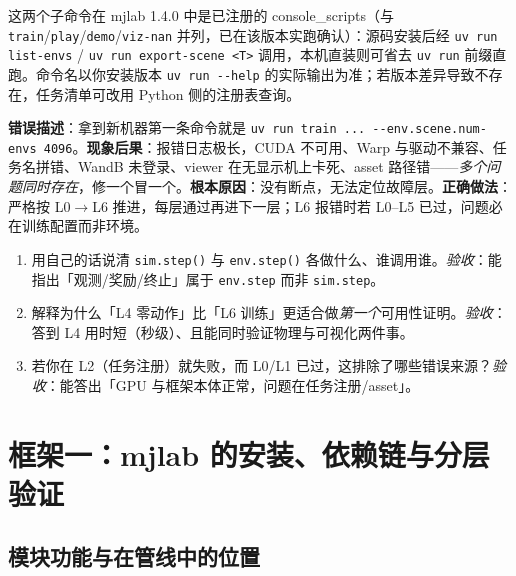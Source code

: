 \begin{note}
这两个子命令在 mjlab 1.4.0 中是已注册的 console\_scripts（与 \verb|train|/\verb|play|/\verb|demo|/\verb|viz-nan| 并列，已在该版本实跑确认）：源码安装后经 \verb|uv run list-envs| / \verb|uv run export-scene <T>| 调用，本机直装则可省去 \verb|uv run| 前缀直跑。命令名以你安装版本 \verb|uv run --help| 的实际输出为准；若版本差异导致不存在，任务清单可改用 Python 侧的注册表查询。
\end{note}

\begin{pitfall}
\textbf{错误描述}：拿到新机器第一条命令就是 \verb|uv run train ... --env.scene.num-envs 4096|。\textbf{现象后果}：报错日志极长，CUDA 不可用、Warp 与驱动不兼容、任务名拼错、WandB 未登录、viewer 在无显示机上卡死、asset 路径错——\emph{多个问题同时存在}，修一个冒一个。\textbf{根本原因}：没有断点，无法定位故障层。\textbf{正确做法}：严格按 L0$\to$L6 推进，每层通过再进下一层；L6 报错时若 L0--L5 已过，问题必在训练配置而非环境。
\end{pitfall}

\begin{practice}[概念主线自检]
\begin{enumerate}
  \item 用自己的话说清 \verb|sim.step()| 与 \verb|env.step()| 各做什么、谁调用谁。\emph{验收}：能指出「观测/奖励/终止」属于 \verb|env.step| 而非 \verb|sim.step|。
  \item 解释为什么「L4 零动作」比「L6 训练」更适合做\emph{第一个}可用性证明。\emph{验收}：答到 L4 用时短（秒级）、且能同时验证物理与可视化两件事。
  \item 若你在 L2（任务注册）就失败，而 L0/L1 已过，这排除了哪些错误来源？\emph{验收}：能答出「GPU 与框架本体正常，问题在任务注册/asset」。
\end{enumerate}
\end{practice}

\section{框架一：mjlab 的安装、依赖链与分层验证}
\label{sec:rlmc-setup-mjlab}

\subsection{模块功能与在管线中的位置}

